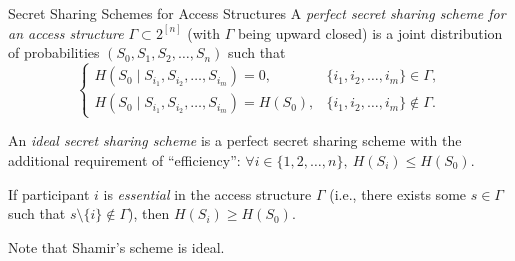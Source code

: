 \documentclass[
handout,
aspectratio=169]{beamer}
\newcommand{\seqn}[2]{{#1}_1,{#1}_2,\dotsc,{#1}_{#2}}
\newcommand{\seqin}[3]{{#1}_{{#2}_1},{#1}_{{#2}_2},\dotsc,{#1}_{{#2}_{#3}}}
\begin{document}
\begin{frame}{Secret Sharing Schemes for Access Structures}
    A \emph{perfect secret sharing scheme for an access structure $\Gamma \subset 2^{[n]}$} (with $\Gamma$ being upward closed) is a joint distribution of probabilities $(S_0, \seqn{S}{n})$ such that
    \[
    \begin{cases}
        H(S_0 \mid \seqin{S}{i}{m}) = 0, & \{\seqn{i}{m}\} \in \Gamma,\\
        H(S_0 \mid \seqin{S}{i}{m}) = H(S_0), & \{\seqn{i}{m}\} \not\in \Gamma.
    \end{cases}
    \]

    An \emph{ideal secret sharing scheme} is a perfect secret sharing scheme with the additional requirement of ``efficiency'':
    $
    \forall i \in \{1, 2, \dotsc, n\},\ H(S_i) \le H(S_0).
    $

\begin{theorem}
    If participant $i$ is \emph{essential} in the access structure $\Gamma$ (i.e., there exists
    some $s \in \Gamma$ such that $s \setminus \{i\} \not\in \Gamma$), then $H(S_i) \ge H(S_0)$.
\end{theorem}

Note that Shamir's scheme is ideal.

\end{frame}
\end{document}
